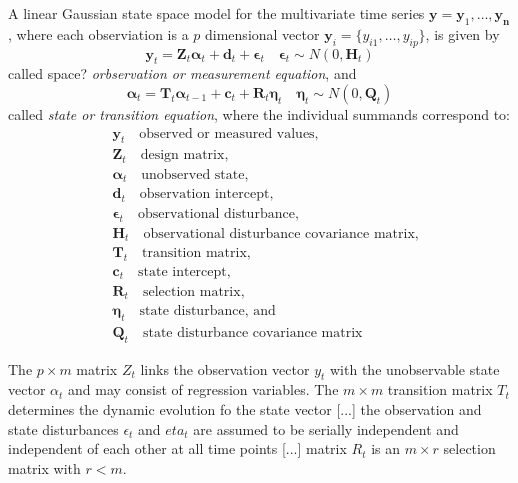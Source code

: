 \begin{definition}
A linear Gaussian state space model for the multivariate time series $\mathbf{y} = \mathbf{y}_1, \ldots, \mathbf{y_n}$, where each observiation is a $p$ dimensional vector $\mathbf{y}_i = \{ y_{i1}, \ldots, y_{ip} \}$, is given by
\begin{equation}
\mathbf{y}_t = \mathbf{Z}_t \mathbf{\alpha}_t + \mathbf{d}_t + \mathbf{\epsilon}_t \quad \mathbf{\epsilon}_t \sim N \left( 0, \mathbf{H}_t \right)
\end{equation}
called {\color{red} space?} \emph{orbservation or measurement equation}, and
\begin{equation}
\mathbf{\alpha}_t = \mathbf{T}_t \mathbf{\alpha}_{t-1} + \mathbf{c}_t + \mathbf{R}_t \mathbf{\eta}_t \quad \mathbf{\eta}_t \sim N \left( 0, \mathbf{Q}_t \right)
\end{equation}
called \emph{state or transition equation}, where the individual summands correspond to:
\begin{align*}
 & \mathbf{y}_t \quad \text{observed or measured values,} \\
 & \mathbf{Z}_t \quad \text{design matrix,} \\
 & \mathbf{\alpha}_t \quad \text{unobserved state,} \\
 & \mathbf{d}_t \quad \text{observation intercept,} \\
 & \mathbf{\epsilon}_t \quad \text{observational disturbance,} \\
 & \mathbf{H}_t \quad \text{observational disturbance covariance matrix,} \\
 & \mathbf{T}_t \quad \text{transition matrix,} \\
 & \mathbf{c}_t \quad \text{state intercept,} \\
 & \mathbf{R}_t \quad \text{selection matrix,}  \\
 & \mathbf{\eta}_t \quad \text{state disturbance, and} \\
 & \mathbf{Q}_t \quad \text{state disturbance covariance matrix}
\end{align*}
\end{definition}

{\color{red} The $p \times m$ matrix $Z_t$ links the observation vector $y_t$ with the unobservable state vector $\alpha_t$ and may consist of regression variables.  The $m \times m$ transition matrix $T_t$ determines the dynamic evolution fo the state vector [...] the observation and state disturbances $\epsilon_t$ and $eta_t$ are assumed to be serially independent and independent of each other at all time points [...] matrix $R_t$ is an $m \times r$ selection matrix with $r < m$.}

